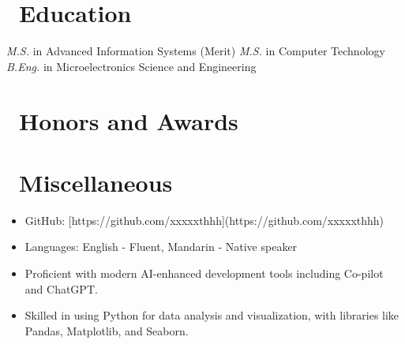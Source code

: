 \documentclass{resume}
\begin{document}
\section{\faGraduationCap\ Education}
\textit{M.S.} in Advanced Information Systems (Merit)
\textit{M.S.} in Computer Technology
\textit{B.Eng.} in Microelectronics Science and Engineering

\section{\faHeartO\ Honors and Awards}

\section{\faInfo\ Miscellaneous}
\begin{itemize}[parsep=0.5ex]
  \item GitHub: [https://github.com/xxxxxthhh](https://github.com/xxxxxthhh)
  \item Languages: English - Fluent, Mandarin - Native speaker
  \item Proficient with modern AI-enhanced development tools including Co-pilot and ChatGPT.
  \item Skilled in using Python for data analysis and visualization, with libraries like Pandas, Matplotlib, and Seaborn.
\end{itemize}
\end{document}
